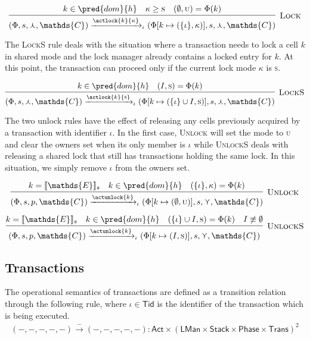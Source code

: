 \[
\infer[\textsc{Lock}]
{
	(\Phi, s, \curlywedge, \mathds{C})
	\xrightarrow{\actlock{k}{\kappa}}_\iota
	(\Phi[k \mapsto (\{\iota\}, \kappa)], s, \curlywedge, \mathds{C})
}
{
	k \in \pred{dom}{h} &
	\kappa \geq \textsc{s} &
	(\emptyset, \textsc{u}) = \Phi(k)
}
\]

The \textsc{LockS} rule deals with the situation where a transaction needs to lock a cell $k$ in shared mode and the lock manager already contains a locked entry for $k$. At this point, the transaction can proceed only if the current lock mode $\kappa$ is \textsc{s}.

\[
\infer[\textsc{LockS}]
{
	(\Phi, s, \curlywedge, \mathds{C})
	\xrightarrow{\actlock{k}{\textsc{s}}}_\iota
	(\Phi[k \mapsto (\{\iota\} \cup I, \textsc{s})], s, \curlywedge, \mathds{C})
}
{
	k \in \pred{dom}{h} &
	(I, \textsc{s}) = \Phi(k)
}
\]

The two unlock rules have the effect of releasing any cells previously acquired by a transaction with identifier $\iota$. In the first case, \textsc{Unlock} will set the mode to \textsc{u} and clear the owners set when its only member is $\iota$ while \textsc{UnlockS} deals with releasing a shared lock that still has transactions holding the same lock. In this situation, we simply remove $\iota$ from the owners set.

\[
\infer[\textsc{Unlock}]
{
	(\Phi, s, p, \mathds{C})
	\xrightarrow{\actunlock{k}}_\iota
	(\Phi[k \mapsto (\emptyset, \textsc{u})], s, \curlyvee, \mathds{C})
}
{
	k = \llbracket \mathds{E} \rrbracket_s &
	k \in \pred{dom}{h} &
	(\{\iota\}, \kappa) = \Phi(k)
}
\]

\[
\infer[\textsc{UnlockS}]
{
	(\Phi, s, p, \mathds{C})
	\xrightarrow{\actunlock{k}}_\iota
	(\Phi[k \mapsto (I, \textsc{s})], s, \curlyvee, \mathds{C})
}
{
	k = \llbracket \mathds{E} \rrbracket_s &
	k \in \pred{dom}{h} &
	(\{\iota\} \cup I, \textsc{s}) = \Phi(k) &
	I \not\equiv \emptyset
}
\]

\subsection{Transactions}
The operational semantics of transactions are defined as a transition relation through the following rule, where $\iota \in \mathsf{Tid}$ is the identifier of the transaction which is being executed.
\begin{gather*}
(-, -, -, -, -) \xrightarrow{-} (-, -, -, -, -) : \mathsf{Act} \times (\mathsf{LMan} \times \mathsf{Stack} \times \mathsf{Phase} \times \mathsf{Trans})^2
\end{gather*}

